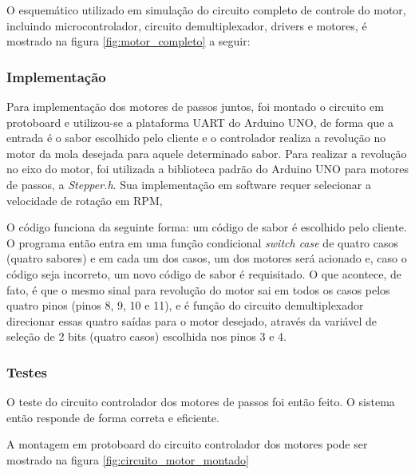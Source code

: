 O esquemático utilizado em simulação do circuito completo de controle do motor, incluindo microcontrolador, circuito demultiplexador, drivers e motores, é mostrado na figura \ref{fig:motor_completo} a seguir:


\subsubsection{Implementação}

Para implementação dos motores de passos juntos, foi montado o circuito em protoboard e utilizou-se a plataforma UART do Arduino UNO, de forma que a entrada é o sabor escolhido pelo cliente e o controlador realiza a revolução no motor da mola desejada para aquele determinado sabor. Para realizar a revolução no eixo do motor, foi utilizada a biblioteca padrão do Arduino UNO para motores de passos, a \textit{Stepper.h}. Sua implementação em software requer selecionar a velocidade de rotação em RPM,

O código funciona da seguinte forma: um código de sabor é escolhido pelo cliente. O programa então entra em uma função condicional \textit{switch case} de quatro casos (quatro sabores) e em cada um dos casos, um dos motores será acionado e, caso o código seja incorreto, um novo código de sabor é requisitado. O que acontece, de fato, é que o mesmo sinal para revolução do motor sai em todos os casos pelos quatro pinos (pinos 8, 9, 10 e 11), e é função do circuito demultiplexador direcionar essas quatro saídas para o motor desejado, através da variável de seleção de 2 bits (quatro casos) escolhida nos pinos 3 e 4. 

\subsubsection{Testes}

O teste do circuito controlador dos motores de passos foi então feito. O sistema então responde de forma correta e eficiente. 

A montagem em protoboard do circuito controlador dos motores pode ser mostrado na figura \ref{fig:circuito_motor_montado}





